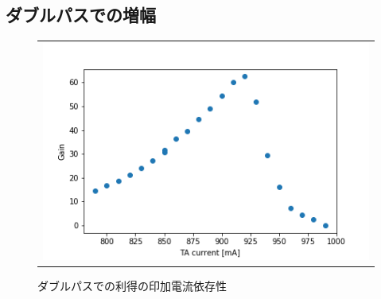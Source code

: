 \documentclass[uplatex, dvipdfmx, a4paper, report, papersize, 11pt]{jsbook}
\begin{document}
\subsection{ダブルパスでの増幅}


\newpage
\begin{figure}[htpb]
  \centering
    \begin{tabular}{c}

      \begin{minipage}{0.70\hsize}
        \centering
          \includegraphics[keepaspectratio,  scale=0.5,  angle=0]
                          {figures/chapter4/double-pass_I-Gain.png}
                          \caption{ダブルパスでの利得の印加電流依存性}
                          \label{double-pass_I-Gain}
      \end{minipage}\\


\end{tabular}
\end{figure}
\end{document}
